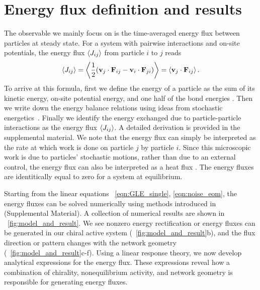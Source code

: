 \documentclass[
 preprint,
 preprintnumbers,
 amsmath,amssymb,
 aps,
 pre,
 longbibliography,
 superscriptaddress,
 10pt, twocolumn
]{revtex4-1}
\begin{document}
\section{Energy flux definition and results} \label{sec:flux}
The observable we mainly focus on is the time-averaged energy flux between particles at steady state. For a system with pairwise interactions and on-site potentials, the energy flux $\expval{J_{ij}}$ from particle $i$ to $j$ reads
\begin{equation} \label{eqn:flux_def}
    \expval{J_{ij}} = \expval{\frac{1}{2} (\mathbf{v}_j \cdot \mathbf{F}_{ij} - \mathbf{v}_i \cdot \mathbf{F}_{ji})}
    = \expval{\mathbf{v}_j \cdot \mathbf{F}_{ij}}.
\end{equation}
To arrive at this formula, first we define the energy of a particle as the sum of its kinetic energy, on-site potential energy, and one half of the bond energies \cite{Lepri2003ThermalConduction}. Then we write down the energy balance relations using ideas from stochastic energetics~\cite{Sekimoto1998LangevinEquation}. Finally we identify the energy exchanged due to particle-particle interactions as the energy flux $\expval{J_{ij}}$. A detailed derivation is provided in the supplemental material.
We note that the energy flux can simply be interpreted as the rate at which work is done on particle $j$ by particle $i$.
Since this microscopic work is due to particles' stochastic motions, rather than due to an external control, the energy flux can also be interpreted as a heat flux \cite{Sekimoto1998LangevinEquation,Lepri2003ThermalConduction}. The energy fluxes are identitically equal to zero for a system at equilibrium.

Starting from the linear equations \eqnname~\eqref{eqn:GLE_single}, \eqref{eqn:noise_eom}, the energy fluxes can be solved numerically using methods introduced in \cite{Gardiner2009ItoCalculus,Ceriotti2010ColoredNoiseThermostats} (Supplemental Material).
A collection of numerical results are shown in \figurename~\ref{fig:model_and_result}. We see nonzero energy rectification or energy fluxes can be generated in our chiral active system (\figurename~\ref{fig:model_and_result}b), and the flux direction or pattern changes with the network geometry (\figurename~\ref{fig:model_and_result}c-f).
Using a linear response theory, we now develop analytical expressions for the energy flux. These expressions reveal how a combination of chirality, nonequilibrium activity, and network geometry is responsible for generating energy fluxes.
\end{document}
